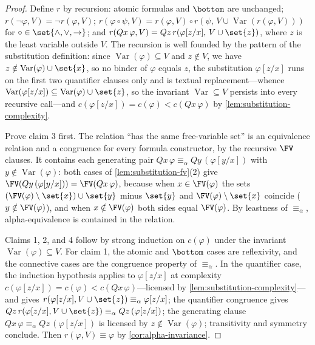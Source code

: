 \begin{proof}
Define \(r\) by recursion: atomic formulas and \(\bottom\) are unchanged;
\(r(\neg\varphi,V)=\neg r(\varphi,V)\);
\(r(\varphi\circ\psi,V)=r(\varphi,V)\circ
r(\psi,\,V\cup\operatorname{Var}(r(\varphi,V)))\) for
\(\circ\in\set{\land,\lor,\to}\); and
\(r(Qx\,\varphi,V)=Qz\,r(\varphi[z/x],\,V\cup\set{z})\), where \(z\) is
the least variable outside \(V\).  The recursion is well founded by the
pattern of the substitution definition: since
\(\operatorname{Var}(\varphi)\subseteq V\) and \(z\notin V\), we have
\(z\notin\operatorname{Var}(\varphi)\cup\set{x}\), so no binder of
\(\varphi\) equals \(z\), the substitution \(\varphi[z/x]\) runs on the
first two quantifier clauses only and is textual replacement---whence
\(\operatorname{Var}(\varphi[z/x])\subseteq
\operatorname{Var}(\varphi)\cup\set{z}\), so the invariant
\(\operatorname{Var}\subseteq V\) persists into every recursive
call---and \(c(\varphi[z/x])=c(\varphi)<c(Qx\,\varphi)\) by
\cref{lem:substitution-complexity}.

Prove claim 3 first.  The relation ``has the same free-variable set''
is an equivalence relation and a congruence for every formula
constructor, by the recursive \(\FV\) clauses.  It contains each
generating pair \(Qx\,\varphi\equiv_\alpha Qy\,(\varphi[y/x])\) with
\(y\notin\operatorname{Var}(\varphi)\): both cases of
\cref{lem:substitution-fv}(2) give
\(\FV(Qy\,(\varphi[y/x]))=\FV(Qx\,\varphi)\), because when
\(x\in\FV(\varphi)\) the sets
\((\FV(\varphi)\setminus\set{x})\cup\set{y}\) minus \(\set{y}\) and
\(\FV(\varphi)\setminus\set{x}\) coincide (\(y\notin\FV(\varphi)\)), and
when \(x\notin\FV(\varphi)\) both sides equal \(\FV(\varphi)\).  By
leastness of \(\equiv_\alpha\), alpha-equivalence is contained in the
relation.

Claims 1, 2, and 4 follow by strong induction on \(c(\varphi)\) under the
invariant \(\operatorname{Var}(\varphi)\subseteq V\).  For claim 1, the
atomic and \(\bottom\) cases are reflexivity, and the connective cases
are the congruence property of \(\equiv_\alpha\).  In the quantifier
case, the induction hypothesis applies to \(\varphi[z/x]\) at complexity
\(c(\varphi[z/x])=c(\varphi)<c(Qx\,\varphi)\)---licensed by
\cref{lem:substitution-complexity}---and gives
\(r(\varphi[z/x],V\cup\set{z})\equiv_\alpha\varphi[z/x]\); the quantifier
congruence gives
\(Qz\,r(\varphi[z/x],V\cup\set{z})\equiv_\alpha Qz\,(\varphi[z/x])\); the
generating clause \(Qx\,\varphi\equiv_\alpha Qz\,(\varphi[z/x])\) is
licensed by \(z\notin\operatorname{Var}(\varphi)\); transitivity and
symmetry conclude.  Then \(r(\varphi,V)\equiv\varphi\) by
\cref{cor:alpha-invariance}.


\end{proof}
